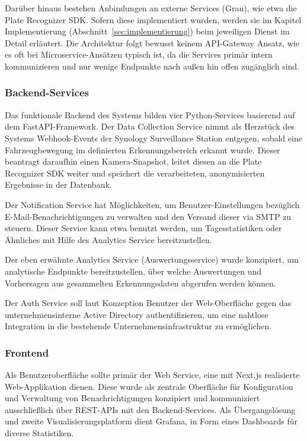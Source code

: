 Darüber hinaus bestehen Anbindungen an externe Services (Grau), wie etwa die Plate Recognizer SDK.
Sofern diese implementiert wurden, werden sie im Kapitel Implementierung (Abschnitt~\ref{sec:implementierung}) beim jeweiligen Dienst im Detail erläutert.
Die Architektur folgt bewusst keinem API-Gateway Ansatz, wie es oft bei Microservice-Ansätzen typisch ist, da die Services primär intern kommunizieren und nur wenige Endpunkte nach außen hin offen zugänglich sind.


\subsubsection{Backend-Services}

Das funktionale Backend des Systems bilden vier Python-Services basierend auf dem FastAPI-Framework.
Der Data Collection Service nimmt als Herzstück des Systems Webhook-Events der Synology Surveillance Station entgegen, sobald eine Fahrzeugbewegung im definierten Erkennungsbereich erkannt wurde.
Dieser beantragt daraufhin einen Kamera-Snapshot, leitet diesen an die Plate Recognizer SDK weiter und speichert die verarbeiteten, anonymisierten Ergebnisse in der Datenbank.

Der Notification Service hat Möglichkeiten, um Benutzer-Einstellungen bezüglich E-Mail-Benachrichtigungen zu verwalten und den Versand dieser via SMTP zu steuern.
Dieser Service kann etwa benutzt werden, um Tagesstatistiken oder Ähnliches mit Hilfe des Analytics Service bereitzustellen.

Der eben erwähnte Analytics Service (Auswertungsservice) wurde konzipiert, um analytische Endpunkte bereitzustellen, über welche Auswertungen und Vorhersagen aus gesammelten Erkennungsdaten abgerufen werden können.

Der Auth Service soll laut Konzeption Benutzer der Web-Oberfläche gegen das unternehmensinterne Active Directory authentifizieren, um eine nahtlose Integration in die bestehende Unternehmensinfrastruktur zu ermöglichen.

\newpage
\subsubsection{Frontend}

Als Benutzeroberfläche sollte primär der Web Service, eine mit Next.js \cite{nextjs} realisierte Web-Applikation dienen.
Diese wurde als zentrale Oberfläche für Konfiguration und Verwaltung von Benachrichtigungen konzipiert und kommuniziert ausschließlich über REST-APIs mit den Backend-Services.
Als Übergangslösung und zweite Visualisierungsplatform dient Grafana, in Form eines Dashboards für diverse Statistiken.

